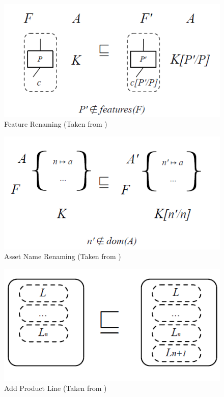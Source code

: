 \documentclass[12pt]{article}
\begin{document}
\begin{figure}[H]
\centering
\includegraphics[width=1\textwidth, frame]{images/FeatureRenaming}
\caption{Feature Renaming (Taken from \cite{phdlmt})}
\end{figure}

\begin{figure}[H]
\centering
\includegraphics[width=1\textwidth, frame]{images/AssetNameRenaming}
\caption{Asset Name Renaming (Taken from \cite{phdlmt})}
\end{figure}

\begin{figure}[H]
\centering
\includegraphics[width=1\textwidth, frame]{images/AddProductLine}
\caption{Add Product Line (Taken from \cite{phdlmt})}
\end{figure}
\end{document}
